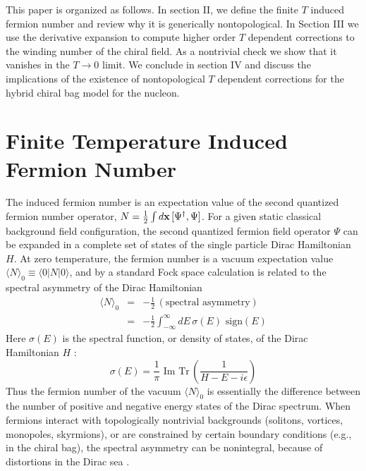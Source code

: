 \documentclass[a4paper,prd,showpacs,showkeys]{revtex4}
\begin{document}
This paper is organized as follows. In section II, we define the finite $T$ induced fermion number and review why it is generically nontopological. In Section III we use the derivative expansion to compute higher order $T$ dependent corrections to the winding number of the chiral field. As a nontrivial check we show that it vanishes in the $T \to 0$ limit. We conclude in section IV and discuss the implications of the existence of nontopological $T$ dependent corrections for the hybrid chiral bag model for the nucleon.

\section{Finite Temperature Induced Fermion Number}

The induced fermion number is an expectation value of the second quantized fermion number operator, $N=\frac{1}{2}\int d{\bf x}\, [\Psi^\dagger,\Psi]$. For a given static classical background field configuration, the second quantized fermion field operator $\Psi$ can be expanded in a complete set of states of the single particle Dirac Hamiltonian $H$. At zero temperature, the fermion number is a vacuum expectation value $\langle N\rangle_0\equiv\langle 0\vert N\vert 0\rangle$, and by a standard Fock space calculation \cite{niemi} is related to the spectral asymmetry of the Dirac Hamiltonian
\begin{eqnarray}
\langle N\rangle_0&=&-\frac{1}{2}\,(\textrm{spectral asymmetry})\nonumber\\
&=&-\frac{1}{2}\int_{-\infty}^{\infty} dE \, \sigma(E)
\,\,\textrm{sign}(E)
\label{asymmetry}
\end{eqnarray}
Here $ \sigma (E)$ is the spectral function, or density of states, of the Dirac Hamiltonian $H$ :
\begin{equation} 
\sigma (E)=\frac{1}{\pi}\textrm{ Im Tr}
\,\left(\frac{1}{H-E-i\epsilon}\right)
\label{spectral}
\end{equation}
Thus the fermion number of the vacuum $\langle N \rangle_0$ is essentially the difference between the number of positive and negative energy states of the Dirac spectrum. When fermions interact with topologically nontrivial backgrounds (solitons, vortices, monopoles, skyrmions), or are constrained by certain boundary conditions (e.g., in the chiral bag), the spectral asymmetry can be nonintegral, because of distortions in the Dirac sea \cite{jackiw,wilczek,niemi}.
\end{document}

